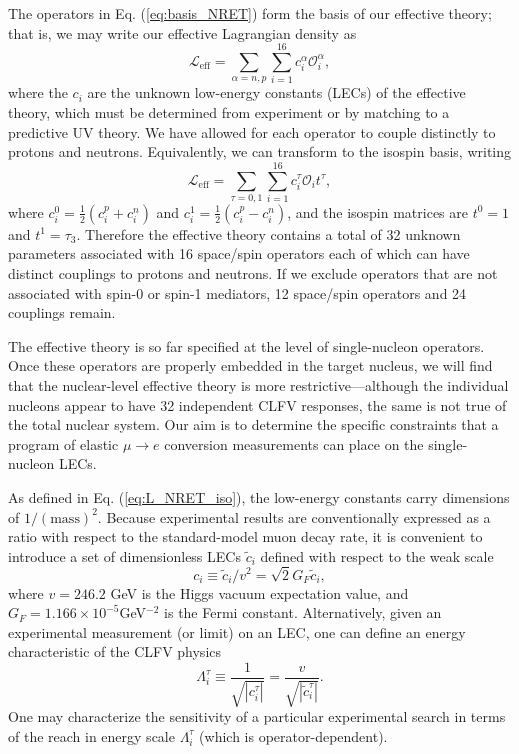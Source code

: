 \documentclass{book}[letterpaper,12pt]
\begin{document}
The operators in Eq. (\ref{eq:basis_NRET}) form the basis of our effective theory; that is, we may write our effective Lagrangian density as
\begin{equation}
\mathcal{L}_\mathrm{eff}=\sum_{\alpha=n,p}\sum_{i=1}^{16}c_i^{\alpha}\mathcal{O}_i^{\alpha},
\end{equation}
where the $c_i$ are the unknown low-energy constants (LECs) of the effective theory, which must be determined from experiment or by matching to a predictive UV theory. We have allowed for each operator to couple distinctly to protons and neutrons. Equivalently, we can transform to the isospin basis, writing
\begin{equation}
\mathcal{L}_\mathrm{eff}=\sum_{\tau=0,1}\sum_{i=1}^{16}c^{\tau}_i\mathcal{O}_it^{\tau},
\label{eq:L_NRET_iso}
\end{equation}
where $c^0_i=\frac{1}{2}\left(c_i^p+c_i^n\right)$ and $c_i^1=\frac{1}{2}\left(c_i^p-c_i^n\right)$, and the isospin matrices are $t^0=1$ and $t^1=\tau_3$. Therefore the effective theory contains a total of 32 unknown parameters associated with 16 space/spin operators each of which can have distinct couplings to protons and neutrons. If we exclude operators that are not associated with spin-0 or spin-1 mediators, 12 space/spin operators and 24 couplings remain. 

The effective theory is so far specified at the level of single-nucleon operators. Once these operators are properly embedded in the target nucleus, we will find that the nuclear-level effective theory is more restrictive---although the individual nucleons appear to have 32 independent CLFV responses, the same is not true of the total nuclear system. Our aim is to determine the specific constraints that a program of elastic $\mu\rightarrow e$ conversion measurements can place on the single-nucleon LECs.

As defined in Eq. (\ref{eq:L_NRET_iso}), the low-energy constants carry dimensions of $1/(\mathrm{mass})^2$. Because experimental results are conventionally expressed as a ratio with respect to the standard-model muon decay rate, it is convenient to introduce a set of dimensionless LECs $\tilde{c}_i$ defined with respect to the weak scale
\begin{equation}
c_i\equiv \tilde{c}_i/v^2=\sqrt{2}G_F\tilde{c}_i,
\end{equation}
where $v=246.2$ GeV is the Higgs vacuum expectation value, and $G_F=1.166\times 10^{-5}$GeV$^{-2}$ is the Fermi constant. Alternatively, given an experimental measurement (or limit) on an LEC, one can define an energy characteristic of the CLFV physics
\begin{equation}
\Lambda_i^{\tau}\equiv\frac{1}{\sqrt{|c_i^{\tau}|}}=\frac{v}{\sqrt{|\tilde{c}_i^{\tau}|}}.
\end{equation}
One may characterize the sensitivity of a particular experimental search in terms of the reach in energy scale $\Lambda^\tau_i$ (which is operator-dependent).
\end{document}
